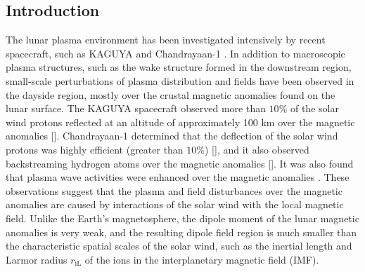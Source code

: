 \documentclass[draft,jgrga]{agutex2015}
\begin{document}
%
%

%

\begin{article}

%
%

\section{Introduction}
The lunar plasma environment has been investigated 
intensively by recent spacecraft,  such as
KAGUYA \citep[e.g.,][]{Saito2008,Saito2010,Saito2012} and
Chandrayaan-1 \citep[e.g.,][]{Barabash2009,Bhardwaj2010}.
In addition to macroscopic plasma structures,
such as the wake structure formed in the downstream region,
small-scale perturbations of plasma distribution and fields have been
 observed in the dayside region,
mostly over the crustal magnetic anomalies found on the lunar surface.
The KAGUYA spacecraft observed
more than $10 \%$ of the solar wind protons reflected at an altitude of approximately 100 km
over the magnetic anomalies [\cite{Saito2010}].
Chandrayaan-1 determined that the deflection of the solar wind protons was highly efficient (greater than $ 10 \%$) [\cite{Lue2011}], and it
also observed backstreaming hydrogen atoms over the magnetic anomalies [\cite{Wieser2010}].
It was also found that
plasma wave activities were enhanced over the magnetic anomalies
\citep[e.g.,][]{Halekas2006a,Hashimoto2010}.
These observations suggest that the plasma and field disturbances over
the magnetic anomalies are caused by interactions of the solar wind with the local magnetic field.
Unlike the Earth's magnetosphere, %
the dipole moment of
the lunar magnetic anomalies is very weak, and
the resulting dipole field region is much smaller than the characteristic spatial scales
of the solar wind, such as the inertial length and Larmor radius $r_\mathrm{iL}$ of the ions
in the interplanetary magnetic field (IMF).




\end{article}
\end{document}
